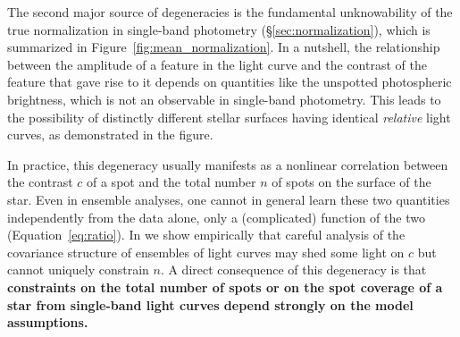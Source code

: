 \documentclass[modern,linenumbers]{aastex62}
\begin{document}
The second major source of degeneracies is the fundamental
unknowability of the true normalization in single-band
photometry (\S\ref{sec:normalization}), which is summarized in
Figure~\ref{fig:mean_normalization}. In a nutshell, the relationship
between the amplitude of a feature in the light curve and the contrast
of the feature that gave rise to it depends on quantities like the
unspotted photospheric brightness, which is not an observable in
single-band photometry. This leads to the possibility of distinctly
different stellar surfaces having identical \emph{relative}
light curves, as demonstrated in the figure.

In practice, this degeneracy usually manifests as a nonlinear correlation
between the contrast $c$ of a spot and the total number $n$
of spots on the surface of the star. Even in ensemble analyses,
one cannot in general learn these two quantities independently from
the data alone,
only a (complicated) function of the two (Equation~\ref{eq:ratio}).
In  we show empirically that
careful analysis of the covariance structure of ensembles of light curves
may shed some light on $c$ but cannot uniquely constrain $n$.
%
A direct consequence of this degeneracy is that \textbf{constraints on
    the total number of spots or on the spot coverage of a star from single-band light curves
    depend strongly on the model assumptions.}
\end{document}
